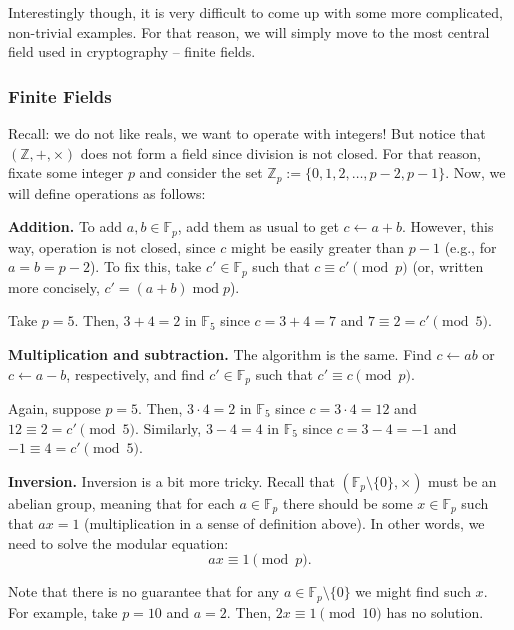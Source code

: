 \documentclass[../lecture-notes.tex]{subfiles}
\begin{document}
Interestingly though, it is very difficult to come up with some more complicated, non-trivial examples. For that reason, we will simply move to the most central field used in cryptography -- finite fields.

\subsubsection{Finite Fields}
Recall: we do not like reals, we want to operate with integers! But notice that $(\mathbb{Z},+,\times)$ does not form a field since division is not closed. For that reason, fixate some integer $p$ and consider the set $\mathbb{Z}_p := \{0,1,2,\dots,p-2,p-1\}$. Now, we will define operations as follows:

\textbf{Addition.} To add $a,b \in \mathbb{F}_p$, add them as usual to get $c \gets a+b$. However, this way, operation is not closed, since $c$ might be easily greater than $p-1$ (e.g., for $a=b=p-2$). To fix this, take $c' \in \mathbb{F}_p$ such that $c \equiv c' \pmod{p}$ (or, written more concisely, $c' = (a+b) \;\text{mod} \; p$). 

\begin{example}
    Take $p=5$. Then, $3+4 = 2$ in $\mathbb{F}_5$ since $c=3+4=7$ and $7 \equiv 2 = c' \pmod{5}$.
\end{example}

\textbf{Multiplication and subtraction.} The algorithm is the same. Find $c \gets ab$ or $c \gets a-b$, respectively, and find $c' \in \mathbb{F}_p$ such that $c' \equiv c \pmod{p}$.

\begin{example}
    Again, suppose $p=5$. Then, $3 \cdot 4 = 2$ in $\mathbb{F}_5$ since $c=3 \cdot 4 = 12$ and $12 \equiv 2 = c' \pmod{5}$. Similarly, $3-4 = 4$ in $\mathbb{F}_5$ since $c=3-4=-1$ and $-1 \equiv 4 = c' \pmod{5}$.
\end{example}

\textbf{Inversion.} Inversion is a bit more tricky. Recall that $(\mathbb{F}_p \setminus \{0\}, \times)$ must be an abelian group, meaning that for each $a \in \mathbb{F}_p$ there should be some $x \in \mathbb{F}_p$ such that $ax = 1$ (multiplication in a sense of definition above). In other words, we need to solve the modular equation:
\begin{equation}
    ax \equiv 1 \pmod{p}.
\end{equation}

Note that there is no guarantee that for any $a \in \mathbb{F}_p \setminus \{0\}$ we might find such $x$. For example, take $p=10$ and $a=2$. Then, $2x \equiv 1 \pmod{10}$ has no solution. 
\end{document}
